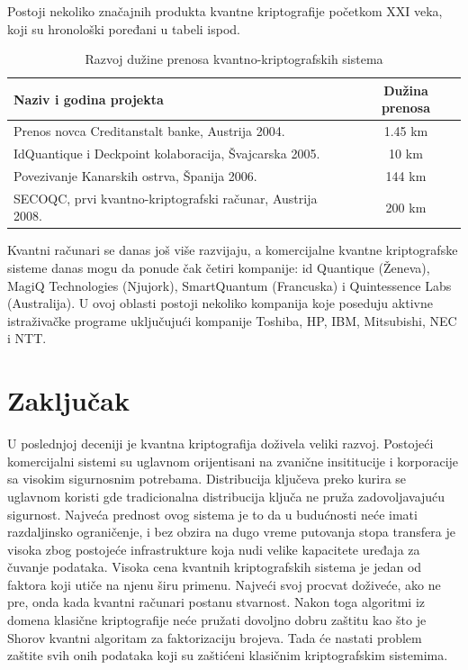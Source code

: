 \documentclass[a4paper]{article}
\begin{document}
{Postoji nekoliko značajnih produkta kvantne kriptografije početkom XXI veka, koji su hronološki poređani u tabeli ispod.
\\
\begin{table}[h]
\centering
\begin{adjustbox}{width=\columnwidth,center}
\begin{tabular}{|l|c|}
\hline
\textbf{Naziv i godina projekta}                           & \textbf{Dužina prenosa} \\ \hline
Prenos novca Creditanstalt banke, Austrija 2004.           & 1.45 km                 \\ \hline
IdQuantique i Deckpoint kolaboracija, Švajcarska 2005.     & 10 km                   \\ \hline
Povezivanje Kanarskih ostrva, Španija 2006.                & 144 km                  \\ \hline
SECOQC, prvi kvantno-kriptografski računar, Austrija 2008. & 200 km                  \\ \hline
\end{tabular}
\end{adjustbox}
\caption{Razvoj dužine prenosa kvantno-kriptografskih sistema}

\label{tabela:kvantnaxxii}
\end{table}

Kvantni računari se danas još više razvijaju, a komercijalne kvantne kriptografske sisteme danas mogu da ponude čak četiri kompanije: id Quantique (Ženeva), MagiQ Technologies (Njujork), SmartQuantum (Francuska) i Quintessence Labs (Australija). U ovoj oblasti postoji nekoliko kompanija koje poseduju aktivne istraživačke programe uključujući kompanije Toshiba, HP, IBM, Mitsubishi, NEC i NTT. 

\section{Zaključak}
\label{sec:zakljucak}

U poslednjoj deceniji je kvantna kriptografija doživela veliki razvoj. Postojeći komercijalni sistemi su uglavnom orijentisani na zvanične insititucije i korporacije sa visokim sigurnosnim potrebama. Distribucija ključeva preko kurira se uglavnom koristi gde tradicionalna distribucija ključa ne pruža zadovoljavajuću sigurnost. Najveća prednost ovog sistema je to da u budućnosti neće imati razdaljinsko ograničenje, i bez obzira na dugo vreme putovanja stopa transfera je visoka zbog postojeće infrastrukture koja nudi velike kapacitete uređaja za čuvanje podataka. Visoka cena kvantnih kriptografskih sistema je jedan od faktora koji utiče na njenu širu primenu. Najveći svoj procvat doživeće, ako ne pre, onda kada kvantni računari postanu stvarnost. Nakon toga algoritmi iz domena klasične kriptografije neće pružati dovoljno dobru zaštitu kao što je Shorov kvantni algoritam za faktorizaciju brojeva. Tada će nastati problem zaštite svih onih podataka koji su zaštićeni klasičnim kriptografskim sistemima.

}
\end{document}
